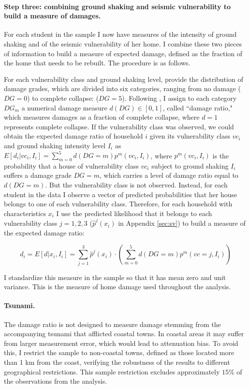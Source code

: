  
 \paragraph{Step three: combining ground shaking and seismic vulnerability to build a measure of damages.} For each student in the sample I now have measures of the intensity of ground shaking and of the seismic vulnerability of her home. I combine these two pieces of information to build a measure of expected damage, defined as the fraction of the home that needs to be rebuilt. The procedure is as follows.\par 
 For each vulnerability class and ground shaking level, \cite{astroza2012} provide the distribution of damage grades, which are divided into six categories, ranging from no damage ($DG=0$) to complete collapse: ($DG=5$). Following \cite{bommer2002development}, I assign to each category $DG_m$ a numerical damage measure $d(DG)\in[0,1]$, called ``damage ratio," which measures damages as a fraction of complete collapse, where $d=1$ represents complete collapse. If the vulnerability class was observed, we could obtain the expected damage ratio of household $i$ given its vulnerability class $vc_i$ and ground shaking intensity level $I_i$ as $E[d_i|vc_i,I_i]=\sum_{m=0}^5 d(DG=m) p^m(vc_i,I_i)$, where $p^m(vc_i,I_i)$ is the probability that a house of vulnerability class $vc_i$ subject to ground shaking $I_i$ suffers a damage grade $DG=m$, which carries a level of damage ratio equal to $d(DG=m)$. But the vulnerability class is not observed. Instead, for each student in the data I observe a vector of predicted probabilities that her house belongs to one of each vulnerability class. Therefore, for each household with characteristics $x_i$ I use the predicted likelihood that it belongs to each vulnerability class $j=1,2,3$ ($\hat{p}^j(x_i)$ in Appendix \ref{sec:sv}) to build a measure of the expected damage ratio:
 
 \begin{equation}\label{eq:measure_damage}
 d_i=E[d|x_i,I_i]=\sum_{j=1}^3 \hat{p}^j(x_i)\cdot \left(\sum_{m=0}^5 d(DG=m)p^m(vc=j,I_i)\right)
 \end{equation}
 
   
 \noindent I standardize this measure in the sample so that it has mean zero and unit variance. This is the measure of home damage used throughout the analysis.\par 

 \paragraph{Tsunami.} The damage ratio is not designed to measure damage stemming from the accompanying tsunami that afflicted coastal towns. In coastal areas it may suffer from larger measurement error, which would lead to attenuation bias. To avoid this, I restrict the sample to non-coastal towns, defined as those located more than 1 km from the coast,  verifying the robustness of the results to different geographical restrictions. This sample restriction excludes approximately $15\%$ of the observations from the analysis.\par 
 
